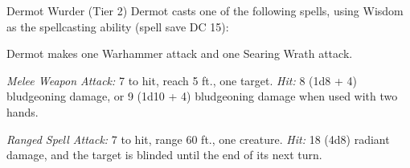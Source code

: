 \documentclass[10pt,a4paper,twoside,bg=print,twocolumn,openany,nodeprecatedcode]{dndbook}
\begin{document}
\begin{DndMonster}[float=t]{Dermot Wurder (Tier 2)}
\DndMonsterBasics[
armor-class = {19 (splint mail)},
hit-points = {\DndDice{15d6 + 30}},
speed = {30 ft.}
]
\DndMonsterAbilityScores[
 str = 18,
 dex = 12,
 con = 14,
 int = 10,
 wis = 18,
 cha = 10
]
\DndMonsterDetails[
saving-throws = {Wis +7, Cha +3},
skills = {Medicine +7, Religion +3, Survival +7},
senses = {darkvision 60 ft., passive perception 14},
languages = {Common, Goblin, Orc},
challenge = 5,
]
Dermot casts one of the following spells, using Wisdom as the spellcasting ability (spell save DC 15):
\begin{DndMonsterSpells}
\end{DndMonsterSpells}
Dermot makes one Warhammer attack and one Searing Wrath attack.

\textsl{Melee Weapon Attack:} 7 to hit, reach 5 ft., one target. \textsl{Hit:} 8 (1d8 + 4) bludgeoning damage, or 9 (1d10 + 4) bludgeoning damage when used with two hands.

\textsl{Ranged Spell Attack:} 7 to hit, range 60 ft., one creature. \textsl{Hit:} 18 (4d8) radiant damage, and the target is blinded until the end of its next turn.

\end{DndMonster}
\end{document}

